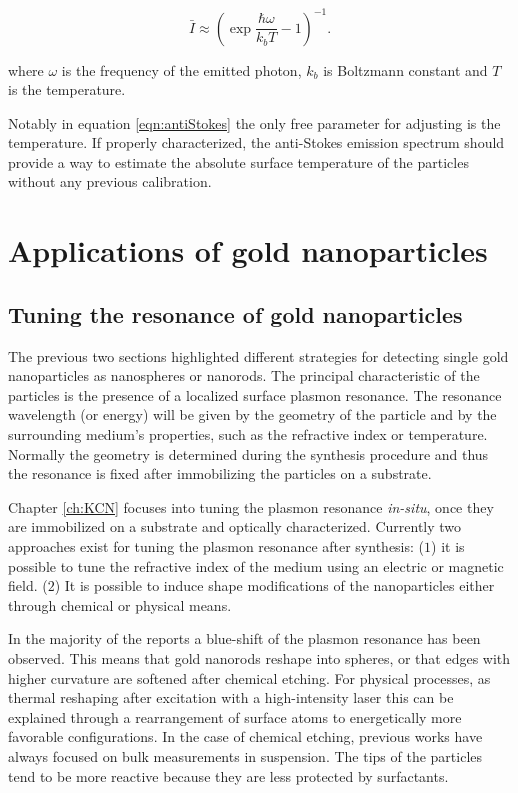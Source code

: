 \begin{equation}\label{eqn:antiStokes}
	\bar{I}\approx\left(\exp\frac{\hbar\omega}{k_bT}-1\right)^{-1}.
\end{equation}

\noindent where $\omega$ is the frequency of the emitted photon, $k_b$ is
Boltzmann constant and $T$ is the temperature. 

Notably in equation \ref{eqn:antiStokes} the only free parameter for adjusting
is the temperature. If properly characterized, the anti-Stokes emission
spectrum should provide a way to estimate the absolute surface temperature of
the particles without any previous calibration. 

\section{Applications of gold nanoparticles}
\subsection{Tuning the resonance of gold nanoparticles}
The previous two sections highlighted different strategies for detecting single
gold nanoparticles as nanospheres or nanorods. The principal characteristic of
the particles is the presence of a localized surface plasmon resonance.
The resonance wavelength (or energy) will be given by the geometry of the
particle and by the surrounding medium's properties, such as the refractive
index or temperature. Normally the geometry is determined during the synthesis
procedure and thus the resonance is fixed after immobilizing the particles on a
substrate.

Chapter \ref{ch:KCN} focuses into tuning the plasmon resonance \textit{in-situ},
once they are immobilized on a substrate and optically characterized. Currently
two approaches exist for tuning the plasmon resonance after synthesis: ($1$) it
is possible to tune the refractive index of the medium using an electric or
magnetic field\cite{Kossyrev2005}. ($2$) It is possible to induce shape
modifications of the nanoparticles either through
chemical\cite{Jana2002,Rodriguez-Fernandez2005,Carbo-Argibay2007,Tsung2006,Ni2008}
or physical means\cite{Link2000,Horiguchi2008,Yorulmaz2012}. 

In the majority of the reports a blue-shift of the plasmon resonance has been
observed. This means that gold nanorods reshape into spheres, or that edges with
higher curvature are softened after chemical etching. For physical processes, as
thermal reshaping after excitation with a high-intensity laser this can be
explained through a rearrangement of surface atoms to energetically more
favorable configurations. In the case of chemical etching, previous works have
always focused on bulk measurements in suspension. The tips of the particles
tend to be more reactive because they are less protected by surfactants. 

